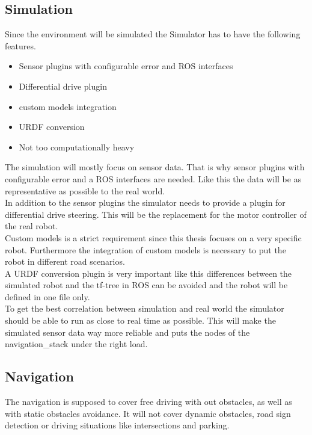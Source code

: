 \subsection{Simulation}
Since the environment will be simulated the Simulator has to have the following features.
\begin{itemize}
	\item Sensor plugins with configurable error and ROS interfaces
	\item Differential drive plugin
	\item custom models integration
	\item URDF conversion
	\item Not too computationally heavy
\end{itemize}

The simulation will mostly focus on sensor data. That is why sensor plugins with configurable error and a ROS interfaces are needed. Like this the data will be as representative as possible to the real world.\\

In addition to the sensor plugins the simulator needs to provide a plugin for differential drive steering. This will be the replacement for the motor controller of the real robot.\\

Custom models is a strict requirement since this thesis focuses on a very specific robot. Furthermore the integration of custom models is necessary to put the robot in different road scenarios.\\

A URDF conversion plugin is very important like this differences between the simulated robot and the tf-tree in ROS can be avoided and the robot will be defined in one file only.\\

To get the best correlation between simulation and real world the simulator should be able to run as close to real time as possible. This will make the simulated sensor data way more reliable and puts the nodes of the navigation\_stack under the right load.

\subsection{Navigation}
The navigation is supposed to cover free driving with out obstacles, as well as with static obstacles avoidance. It will not cover dynamic obstacles, road sign detection or driving situations like intersections and parking.\\

